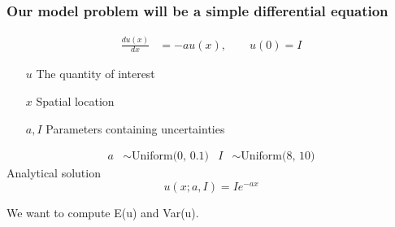 \documentclass[handout]{beamer}
\begin{document}
\begin{frame}
 \frametitle{Our model problem will be a simple differential equation}
 \vspace{-10mm}
  \begin{align*}
    \frac{d u(x)}{dx} & =-au(x),\qquad u(0) = I
  \end{align*}
  \vspace{-5 mm}
  \begin{itemize}
    \item[$u$] The quantity of interest
    \item[$x$] Spatial location
    \item[$a,I$] Parameters containing uncertainties
  \end{itemize}

\vspace{-5 mm}
 \pause
\begin{align*}
a &\sim \text{Uniform(0, 0.1)} & I& \sim \text{Uniform(8, 10)}
\end{align*}
\pause
\vspace{5 mm}
Analytical solution
\[u(x; a, I) = Ie^{-ax}\]

\pause
\vspace{5mm}
We want to compute E(u) and Var(u).

\end{frame}
\end{document}
